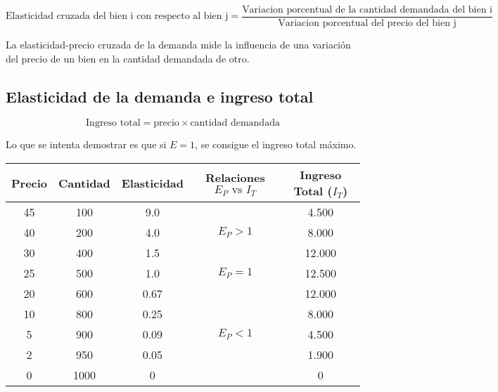 \begin{equation*}
    \text{Elasticidad cruzada del bien i con respecto al bien j} = \frac{\text{Variacion porcentual de la cantidad demandada del bien i}}{\text{Variacion porcentual del precio del bien j}}
\end{equation*}

La elasticidad-precio cruzada de la demanda mide la influencia de una variación del precio de un bien en la cantidad demandada de otro.

\subsection{Elasticidad de la demanda e ingreso total}

\begin{equation*}
    \text{Ingreso total} = \text{precio} \times \text{cantidad demandada}
\end{equation*}

Lo que se intenta demostrar es que si \(E = 1\),
se consigue el ingreso total máximo.

\begin{table}[h!]
    \centering
    \begin{tabular}{ccccc}
        \hline
        Precio & Cantidad & Elasticidad & Relaciones \(E_P \text{ vs } I_T\) & Ingreso Total (\(I_T\)) \\
        \hline
        45     & 100      & 9.0         &                                    & 4.500                   \\
        40     & 200      & 4.0         & \(E_P > 1\)                        & 8.000                   \\
        30     & 400      & 1.5         &                                    & 12.000                  \\
        25     & 500      & 1.0         & \(E_P = 1\)                        & 12.500                  \\
        20     & 600      & 0.67        &                                    & 12.000                  \\
        10     & 800      & 0.25        &                                    & 8.000                   \\
        5      & 900      & 0.09        & \(E_P < 1\)                        & 4.500                   \\
        2      & 950      & 0.05        &                                    & 1.900                   \\
        0      & 1000     & 0           &                                    & 0                       \\
        \hline
    \end{tabular}
\end{table}

